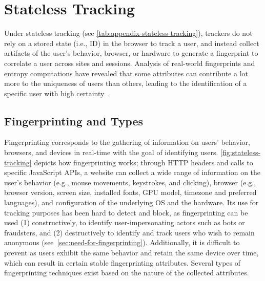 \section{Stateless Tracking}
\label{sec:stateless-tracking}

Under stateless tracking (see \autoref{tab:appendix-stateless-tracking}), trackers do not rely on a stored state (i.e., ID) in the browser to track a user, and instead collect artifacts of the user's behavior, browser, or hardware to generate a fingerprint to correlate a user across sites and sessions.
% 
Analysis of real-world fingerprints and entropy computations have revealed that some attributes can contribute a lot more to the uniqueness of users than others, leading to the identification of a specific user with high certainty~\cite{eckersleyHowUniqueYour2010,laperdrixBeautyBeastDiverting2016,gomez-boixHidingCrowdAnalysis2018,bacis2024assessing}. 
%


\subsection{Fingerprinting and Types}

Fingerprinting corresponds to the gathering of information on users’ behavior, browsers, and devices in real-time with the goal of identifying users. 
%
\autoref{fig:stateless-tracking} depicts how fingerprinting works; through HTTP headers and calls to specific JavaScript APIs, a website can collect a wide range of information on the user's behavior (e.g., mouse movements, keystrokes, and clicking), browser (e.g., browser version, screen size, installed fonts, GPU model, timezone and preferred languages), and configuration of the underlying OS and the hardware. 
% 
Its use for tracking purposes has been hard to detect and block, as fingerprinting can be used (1) constructively, to identify user-impersonating actors such as bots or fraudsters, and (2) destructively to identify and track users who wish to remain anonymous (see~\autoref{sec:need-for-fingerprinting}). 
%
Additionally, it is difficult to prevent as users exhibit the same behavior and retain the same device over time, which can result in certain stable fingerprinting attributes.
%
Several types of fingerprinting techniques exist based on the nature of the collected attributes.


